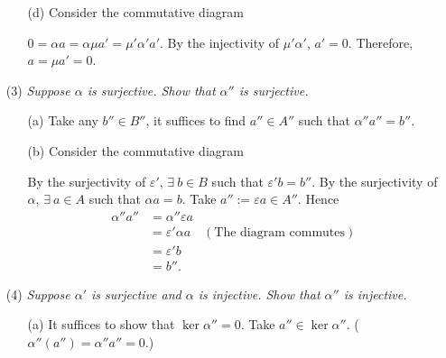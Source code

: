 \documentclass{article}
\begin{document}
\begin{enumerate}
\begin{enumerate}
  \item[(d)]
    Consider the commutative diagram
    \begin{center}
    \end{center}
    $0 = \alpha a = \alpha\mu a' = \mu'\alpha' a'$.
    By the injectivity of $\mu'\alpha'$, $a' = 0$.
    Therefore, $a = \mu a' = 0$.
  \end{enumerate}

\item[(3)]
  \emph{Suppose $\alpha$ is surjective. Show that $\alpha''$ is surjective.}
  \begin{enumerate}
  \item[(a)]
    Take any $b'' \in B''$, it suffices to find $a'' \in A''$ such that $\alpha'' a'' = b''$.

  \item[(b)]
    Consider the commutative diagram
    \begin{center}
    \end{center}
    By the surjectivity of $\varepsilon'$,
    $\exists \: b \in B$ such that $\varepsilon' b = b''$.
    By the surjectivity of $\alpha$,
    $\exists \: a \in A$ such that $\alpha a = b$.
    Take $a'' := \varepsilon a \in A''$.
    Hence
    \begin{align*}
      \alpha'' a''
      &= \alpha'' \varepsilon a \\
      &= \varepsilon' \alpha a
        &(\text{The diagram commutes}) \\
      &= \varepsilon' b \\
      &= b''.
    \end{align*}
  \end{enumerate}

\item[(4)]
  \emph{Suppose $\alpha'$ is surjective and $\alpha$ is injective.
  Show that $\alpha''$ is injective.}
  \begin{enumerate}
  \item[(a)]
    It suffices to show that $\ker\alpha'' = 0$.
    Take $a'' \in \ker\alpha''$. ($\alpha''(a'') = \alpha'' a'' = 0$.)


\end{enumerate}
\end{enumerate}
\end{document}
